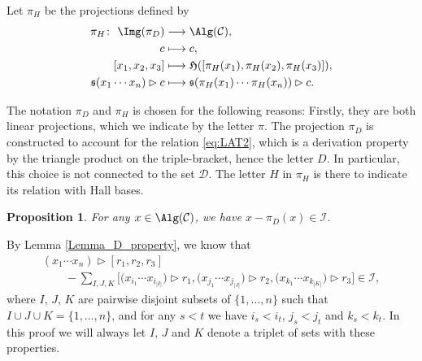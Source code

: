 \documentclass[pdftex]{sigma}
\numberwithin{equation}{section}
\newtheorem{Proposition}[Theorem]{Proposition}
 { \theoremstyle{definition}
\newtheorem{Definition}[Theorem]{Definition}
\newtheorem{Note}[Theorem]{Note}
\newtheorem{Example}[Theorem]{Example}
\newtheorem{Remark}[Theorem]{Remark} }
\begin{document}
Let $\pi_H$ be the projections defined by
\begin{align*}
 \pi_H\colon \ \Img(\pi_D) &\longrightarrow \Alg(\mathcal{C}), \\
 c & \longmapsto c, \\
 [x_1, x_2 ,x_3] &\longmapsto \mathfrak{H}([\pi_H(x_1), \pi_H(x_2) , \pi_H(x_3)] ), \\
 \mathfrak{s}(x_1 \cdots x_n) \rhd c & \longmapsto \mathfrak{s}(\pi_H(x_1) \cdots \pi_H(x_n))\rhd c.
\end{align*}

\begin{Note}
 The notation $\pi_D$ and $\pi_H$ is chosen for the following reasons: Firstly, they are both linear projections, which we indicate by the letter $\pi$. The projection $\pi_D$ is constructed to account for the relation \eqref{eq:LAT2}, which is a derivation property by the triangle product on the triple-bracket, hence the letter $D$. In particular, this choice is not connected to the set $\mathcal{D}$. The letter $H$ in $\pi_H$ is there to indicate its relation with Hall bases.
\end{Note}


\begin{Proposition}\label{id-D_in_I}
For any $x \in \Alg(\mathcal{C})$, we have $x-\pi_D(x) \in \mathcal{I}$.
\end{Proposition}

By Lemma \ref{Lemma_D_property}, we know that
\begin{gather*}
 (x_1 \cdots x_n) \rhd [r_1, r_2, r_3] \\
\qquad - \sum_{I,J,K} \bigl[\bigl(x_{i_1} \cdots x_{i_{|I|}}\bigr) \rhd r_1, \bigl(x_{j_1} \cdots x_{j_{|J|}}\bigr) \rhd r_2, \bigl(x_{k_1} \cdots x_{k_{|K|}}\bigr) \rhd r_3\bigr] \in \mathcal{I},
\end{gather*}
where $I$, $J$, $K$ are pairwise disjoint subsets of $\{1, \dots , n\}$ such that $I \cup J \cup K = \{1, \dots , n \}$, and for any $s < t$ we have $i_s < i_t$, $j_s < j_t$ and $k_s < k_t$. In this proof we will always let $I$, $J$ and $K$ denote a triplet of sets with these properties.
\end{document}
